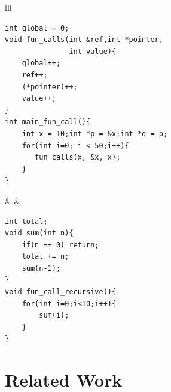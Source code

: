 \begin{tabular}{lll}
\noindent\begin{minipage}{.43\columnwidth}
\begin{lstlisting}[label=code:function_call,caption={Function Calls}]
int global = 0;
void fun_calls(int &ref,int *pointer, 
               int value){
    global++;
    ref++;
    (*pointer)++;
    value++;
}
int main_fun_call(){
    int x = 10;int *p = &x;int *q = p;
    for(int i=0; i < 50;i++){
       fun_calls(x, &x, x);
    }
}
\end{lstlisting}    
\end{minipage}
&
&
\noindent\begin{minipage}{.43\columnwidth}
\begin{lstlisting}[label=code:recursive_call,caption={Recursive Function Calls}]
int total;
void sum(int n){
    if(n == 0) return;
    total += n;
    sum(n-1);
}
void fun_call_recursive(){
    for(int i=0;i<10;i++){
        sum(i);
    }
}
\end{lstlisting}
\end{minipage}
\end{tabular}



\section{Related Work}


